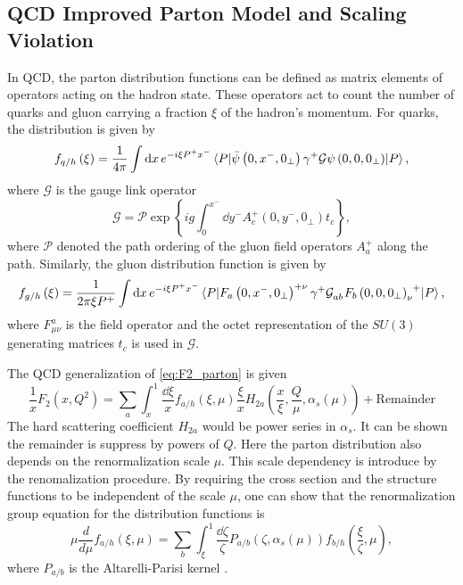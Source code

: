 \documentclass[../main.tex]{subfiles}
\begin{document}
\subsection{QCD Improved Parton Model and Scaling Violation}
\label{subsec:scaling_violation}
In QCD, the parton distribution functions can be defined as matrix elements of
operators acting on the hadron state. These operators act to count the number of
quarks and gluon carrying a fraction $\xi$ of the hadron's momentum. For quarks,
the distribution is given by \cite{collins1989}
\begin{equation}
	f_{q/h}\left(\xi\right) = \frac{1}{4\pi}\int \dd{x} e^{-i\xi P^{+} x^{-}} \mel{P}{\bar{\psi}\left(0,x^-,0_\perp\right)\gamma^+ \mathcal{G} \psi\left(0,0,0_\perp\right)}{P},
\end{equation}
where $\mathcal{G}$ is the gauge link operator
\begin{equation}
	\mathcal{G}=\mathcal{P} \exp \left\{ ig\int_0^{x^-}\dd{y^-} A_c^+ \left(0,y^-,0_\perp\right)t_c\right\},
\end{equation}
where $\mathcal{P}$ denoted the path ordering of the gluon field operators $A_a^+$
along the path. Similarly, the gluon distribution function is given by
\begin{equation}
	f_{g/h}\left(\xi\right) = \frac{1}{2\pi\xi P^+}\int \dd{x} e^{-i\xi P^{+} x^{-}} \mel{P}{\tensor{F_a\left(0,x^-,0_\perp\right)}{^+^\nu}\gamma^{+} \tensor{\mathcal{G}}{_a_b} \tensor{F_b\left(0,0,0_\perp\right)}{_\nu^+}}{P},
\end{equation}
where $F^a_{\mu\nu}$ is the field operator and the octet representation of the $SU(3)$
generating matrices $t_c$ is used in $\mathcal{G}$.


The QCD generalization of \cref{eq:F2_parton} is given
\begin{equation}
	\frac{1}{x}F_2\left(x,Q^2\right) = \sum_a \int_x^1 \frac{\dd{\xi}}{x}f_{a/h}\left(\xi,\mu\right)\frac{\xi}{x}H_{2a}\left( \frac{x}{\xi}, \frac{Q}{\mu}, \alpha_s\left(\mu\right)\right)
	+ \text{Remainder}
\end{equation}
The hard scattering coefficient $H_{2a}$ would be power series in $\alpha_s$. It
can be shown the remainder is suppress by powers of $Q$. Here the parton
distribution also depends on the renormalization scale $\mu$. This scale
dependency is introduce by the renomalization procedure. By requiring the cross
section and the structure functions to be independent of the scale $\mu$,
one can show that the renormalization group equation for the distribution
functions is
\begin{equation}
	\mu\frac{d}{d\mu}f_{a/h}\left(\xi,\mu\right)=\sum_b \int_\xi^1 \frac{\dd{\zeta}}{\zeta} P_{a/b}\left(\zeta,\alpha_s\left(\mu\right)\right) f_{b/h}\left(\frac{\xi}{\zeta},\mu\right),
\end{equation}
where $P_{a/b}$ is the Altarelli-Parisi kernel \cite{altarelli1977}.
\end{document}
